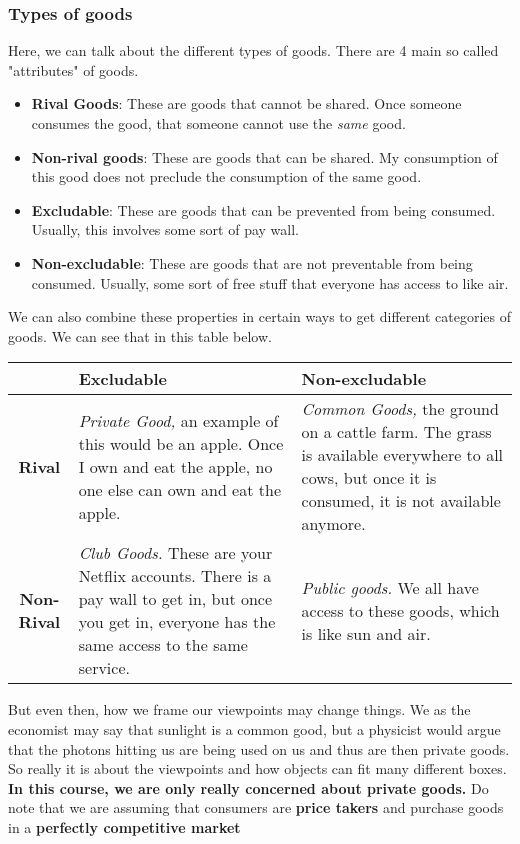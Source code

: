 \documentclass{article}
\begin{document}
\subsubsection{Types of goods}
Here, we can talk about the different types of goods. There are 4 main so called "attributes" of goods.
\begin{itemize}
    \item \textbf{Rival Goods}: These are goods that cannot be shared. Once someone consumes the good, that someone cannot use the \textit{same }good. 
    \item \textbf{Non-rival goods}: These are goods that can be shared. My consumption of this good does not preclude the consumption of the same good. 
    \item \textbf{Excludable}: These are goods that can be prevented from being consumed. Usually, this involves some sort of pay wall. 
    \item \textbf{Non-excludable}: These are goods that are not preventable from being consumed. Usually, some sort of free stuff that everyone has access to like air. 
\end{itemize}
We can also combine these properties in certain ways to get different categories of goods. We can see that in this table below. 
\begin{table}[h]
    \centering
    \begin{tabular}{c|p{6.9cm}|p{6.9cm}} %
        \hspace{1pt} & \textbf{Excludable} & \textbf{Non-excludable} \\ \hline
        \textbf{Rival} & 
        \textit{Private Good,} an example of this would be an apple. Once I own and eat the apple, no one else can own and eat the apple. & 
        \textit{Common Goods,} the ground on a cattle farm. The grass is available everywhere to all cows, but once it is consumed, it is not available anymore. \\
       \textbf{ Non-Rival} & \textit{Club Goods.} These are your Netflix accounts. There is a pay wall to get in, but once you get in, everyone has the same access to the same service. & \textit{Public goods.} We all have access to these goods, which is like sun and air. 
    \end{tabular}
\end{table}
But even then, how we frame our viewpoints may change things. We as the economist may say that sunlight is a common good, but a physicist would argue that the photons hitting us are being used on us and thus are then private goods. So really it is about the viewpoints and how objects can fit many different boxes. \textbf{In this course, we are only really concerned about private goods.} Do note that we are assuming that consumers are \textbf{price takers} and purchase goods in a \textbf{perfectly competitive market}
\end{document}
